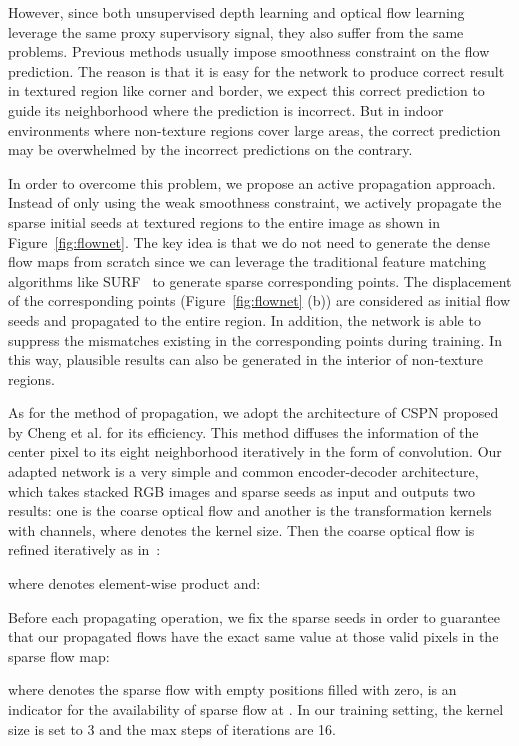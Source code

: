 \documentclass[10pt,twocolumn,letterpaper]{article}
\begin{document}
However, since both unsupervised depth learning and optical flow learning leverage the same proxy supervisory signal, they also suffer from the same problems. Previous methods usually impose smoothness constraint on the flow prediction. The reason is that it is easy for the network to produce correct result in textured region like corner and border, we expect this correct prediction to guide its neighborhood where the prediction is incorrect. But in indoor environments where non-texture regions cover large areas, the correct prediction may be overwhelmed by the incorrect predictions on the contrary.

In order to overcome this problem, we propose an active propagation approach. Instead of only using the weak smoothness constraint, we actively propagate the sparse initial seeds at textured regions to the entire image as shown in Figure~\ref{fig:flownet}. The key idea is that we do not need to generate the dense flow maps from scratch since we can leverage the traditional feature matching algorithms like SURF~\cite{bay2006surf} to generate sparse corresponding points. The displacement of the corresponding points (Figure~\ref{fig:flownet} (b)) are considered as initial flow seeds and propagated to the entire region. In addition, the network is able to suppress the mismatches existing in the corresponding points during training. In this way,  plausible results can also be generated in the interior of non-texture regions.

As for the method of propagation, we adopt the architecture of CSPN proposed by Cheng et al.\cite{cheng2018depth,cheng2018depth2} for its efficiency. This method diffuses the information of the center pixel to its eight neighborhood iteratively in the form of convolution. Our adapted network is a very simple and common encoder-decoder architecture, which takes stacked RGB images and sparse seeds as input and outputs two results: one is the coarse optical flow  and another is the  transformation kernels  with  channels, where  denotes the kernel size. Then the coarse optical flow is refined iteratively as in~\cite{cheng2018depth,cheng2018depth2}:


where  denotes element-wise product and:


Before each propagating operation, we fix the sparse seeds in order to guarantee that our propagated flows have the exact same value at those
valid pixels in the sparse flow map:


where  denotes the sparse flow with empty positions filled with zero,  is an indicator for the availability of sparse flow at . In our training setting, the kernel size  is set to 3 and the max steps of iterations are 16. 
\end{document}
